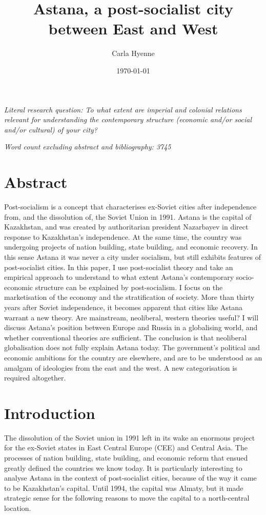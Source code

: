 \documentclass{article}
\title{Astana, a post-socialist city between East and West}
\author{Carla Hyenne}
\date{\today}
\begin{document}
\maketitle 

\textit{Literal research question: To what extent are imperial and colonial relations relevant for understanding the contemporary structure (economic and/or social and/or cultural) of your city?}

\textit{Word count excluding abstract and bibliography: 3745}

\section{Abstract}

Post-socialism is a concept that characterises ex-Soviet cities after independence from, and the dissolution of, the Soviet Union in 1991.
Astana is the capital of Kazakhstan, and was created by authoritarian president Nazarbayev in direct response to Kazakhstan's independence. At the same time, the country was undergoing projects of nation building, state building, and economic recovery. In this sense Astana it was never a city under socialism, but still exhibits features of post-socialist cities. In this paper, I use post-socialist theory and take an empirical approach to understand to what extent Astana's contemporary socio-economic structure can be explained by post-socialism. 
I focus on the marketisation of the economy and the stratification of society. 
More than thirty years after Soviet independence, it becomes apparent that cities like Astana warrant a new theory. 
Are mainstream, neoliberal, western theories useful? I will discuss Astana's position between Europe and Russia in a globalising world, and whether conventional theories are sufficient. 
The conclusion is that neoliberal globalisation does not fully explain Astana today. The government's political and economic ambitions for the country are elsewhere, and are to be understood as an amalgam of ideologies from the east and the west. A new categorisation is required altogether.

\section{Introduction}

The dissolution of the Soviet union in 1991 left in its wake an enormous project for the ex-Soviet states in East Central Europe (CEE) and Central Asia. The processes of nation building, state building, and economic reform that ensued greatly defined the countries we know today. It is particularly interesting to analyse Astana in the context of post-socialist cities, because of the way it came to be Kazakhstan's capital. 
Until 1994, the capital was Almaty, but it made strategic sense for the following reasons to move the capital to a north-central location. 
\end{document}
